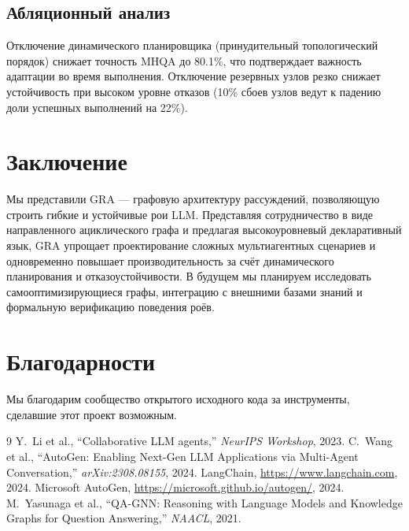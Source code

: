 \documentclass[11pt]{article}
\begin{document}
\subsection{Абляционный анализ}
Отключение динамического планировщика (принудительный топологический порядок) снижает точность MHQA до 80.1\%, что подтверждает важность адаптации во время выполнения.
Отключение резервных узлов резко снижает устойчивость при высоком уровне отказов (10\% сбоев узлов ведут к падению доли успешных выполнений на 22\%).

\section{Заключение}
Мы представили GRA --- графовую архитектуру рассуждений, позволяющую строить гибкие и устойчивые рои LLM.
Представляя сотрудничество в виде направленного ациклического графа и предлагая высокоуровневый декларативный язык, GRA упрощает проектирование сложных мультиагентных сценариев и одновременно повышает производительность за счёт динамического планирования и отказоустойчивости.
В будущем мы планируем исследовать самооптимизирующиеся графы, интеграцию с внешними базами знаний и формальную верификацию поведения роёв.

\section*{Благодарности}
Мы благодарим сообщество открытого исходного кода за инструменты, сделавшие этот проект возможным.


\begin{thebibliography}{9}
 Y.~Li et al., ``Collaborative LLM agents,'' \textit{NeurIPS Workshop}, 2023.
 C.~Wang et al., ``AutoGen: Enabling Next-Gen LLM Applications via Multi-Agent Conversation,'' \textit{arXiv:2308.08155}, 2024.
 LangChain, \url{https://www.langchain.com}, 2024.
 Microsoft AutoGen, \url{https://microsoft.github.io/autogen/}, 2024.
 M.~Yasunaga et al., ``QA-GNN: Reasoning with Language Models and Knowledge Graphs for Question Answering,'' \textit{NAACL}, 2021.
\end{thebibliography}
\end{document}
